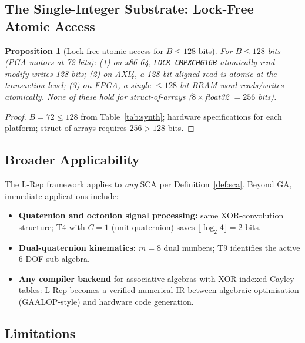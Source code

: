 \documentclass[11pt,a4paper]{article}
\theoremstyle{definition}
\theoremstyle{plain}
\newtheorem{proposition}{Proposition}[section]
\theoremstyle{remark}
\begin{document}
\subsection{The Single-Integer Substrate: Lock-Free Atomic Access}

\begin{proposition}[Lock-free atomic access for $B\le128$ bits]
\label{prop:atomic}
For $B\le128$ bits (PGA motors at 72 bits): (1) on x86-64,
\texttt{LOCK~CMPXCHG16B} atomically read-modify-writes 128 bits;
(2) on AXI4, a 128-bit aligned read is atomic at the transaction level;
(3) on FPGA, a single $\le128$-bit BRAM word reads/writes atomically.
None of these hold for struct-of-arrays ($8\times$float32 $=256$ bits).
\end{proposition}

\begin{proof}
$B=72\le128$ from Table~\ref{tab:synth}; hardware specifications for
each platform; struct-of-arrays requires $256>128$ bits.
\end{proof}

\subsection{Broader Applicability}

The L-Rep framework applies to \emph{any} SCA per Definition~\ref{def:sca}.
Beyond GA, immediate applications include:
\begin{itemize}
  \item \textbf{Quaternion and octonion signal processing:}
        same XOR-convolution structure; T4 with $C=1$ (unit quaternion)
        saves $\lfloor\log_2 4\rfloor=2$ bits.
  \item \textbf{Dual-quaternion kinematics:}
        $m=8$ dual numbers; T9 identifies the active 6-DOF sub-algebra.
  \item \textbf{Any compiler backend} for associative algebras with
        XOR-indexed Cayley tables: L-Rep becomes a verified
        numerical IR between algebraic optimisation (GAALOP-style)
        and hardware code generation.
\end{itemize}

\subsection{Limitations}
\end{document}
